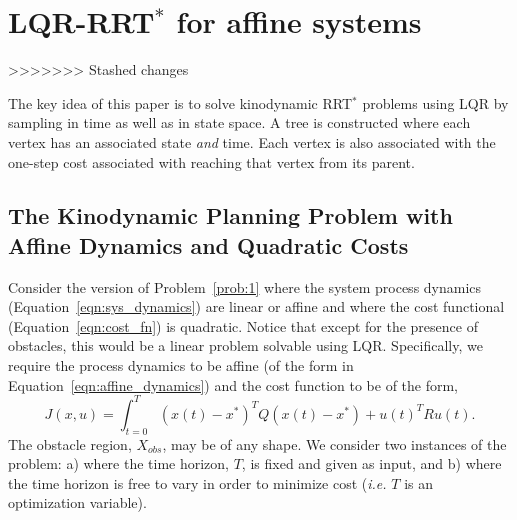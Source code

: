 \documentclass[letterpaper, 10pt, english, conference]{IEEEtran}
\begin{document}


\section{LQR-RRT$^*$ for affine systems}
>>>>>>> Stashed changes

The key idea of this paper is to solve kinodynamic RRT$^*$ problems
using LQR by sampling in time as well as in state space. A tree is
constructed where each vertex has an associated state {\em and}
time. Each vertex is also associated with the one-step cost associated
with reaching that vertex from its parent.


\subsection{The Kinodynamic Planning Problem with Affine Dynamics
and Quadratic Costs}

Consider the version of Problem~\ref{prob:1} where the system process
dynamics (Equation~\ref{eqn:sys_dynamics}) are linear or affine and
where the cost functional (Equation~\ref{eqn:cost_fn}) is
quadratic. Notice that except for the presence of obstacles, this
would be a linear problem solvable using LQR. Specifically, we require
the process dynamics to be affine (of the form in
Equation~\ref{eqn:affine_dynamics}) and the cost function to be of the
form,
\begin{equation}
J(x,u) = \int_{t=0}^{T} (x(t)-x^*)^T Q (x(t)-x^*) + u(t)^T R
u(t).
\label{eqn:affine_lqr_cost_nofinal}
\end{equation}
The obstacle region, $X_{obs}$, may be of any shape. We consider two
instances of the problem: a) where the time horizon, $T$, is fixed and
given as input, and b) where the time horizon is free to vary in order
to minimize cost ({\em i.e.} $T$ is an optimization variable).
\end{document}
